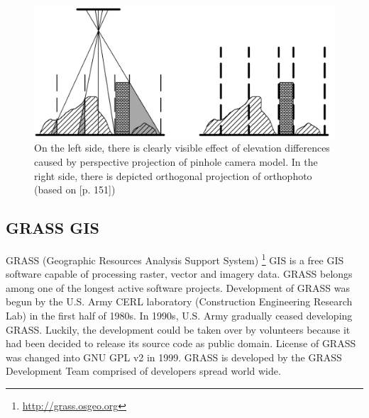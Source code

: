 \documentclass[a4paper,12pt]{article}
\begin{document}


\begin{figure}[h]
    \centering
    \includegraphics[scale=0.2]{figures/orthophoto.png}
    \caption{On the left side, there is clearly visible effect of elevation differences 
    caused by perspective projection of pinhole camera model. 
    In the right side, there is depicted orthogonal projection of orthophoto (based on \cite{pavelka2004foto20}[p. 151])}
    \label{fig:ortho}
\end{figure}


\subsection{GRASS GIS}
\label{sec:GRASS_intro}

GRASS (Geographic Resources Analysis Support System) \footnote{\url{http://grass.osgeo.org}} 
GIS is a free GIS software 
capable of processing raster, vector and imagery data. 
GRASS belongs among one of 
the longest active software projects. Development of GRASS was begun by the U.S. Army CERL laboratory (Construction Engineering Research Lab)
in the first half of 1980s. In 1990s, U.S. Army gradually ceased developing GRASS. Luckily, 
the development could be taken over by volunteers because
it had been decided to release its source code as public domain.  License 
of GRASS was changed into GNU GPL v2 in 1999. GRASS is developed by the GRASS Development 
Team comprised of developers spread world wide. 
\end{document}
